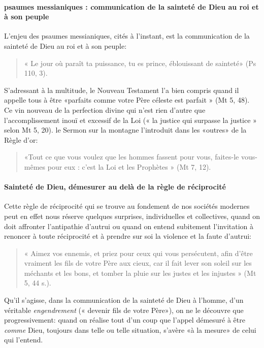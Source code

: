 \paragraph{psaumes messianiques : communication de la sainteté de Dieu au roi et à son peuple}
L'enjeu des psaumes messianiques, cités à l'instant, est la communication de la sainteté de Dieu au roi et à son peuple:
\begin{quote}
    « Le jour où paraît ta puissance, tu es prince, éblouissant de sainteté» (Ps 110, 3). 
\end{quote}
S'adressant à la multitude, le Nouveau Testament l'a bien compris quand il appelle tous à être «parfaits comme votre Père céleste est parfait » (Mt 5, 48).
Ce vin nouveau de la perfection divine qui n'est rien d'autre que l'accomplissement inouï et excessif de la Loi (« la justice qui surpasse la justice » selon Mt 5, 20). le Sermon sur la montagne l'introduit dans les «outres» de la Règle d'or:
\begin{quote}
    «Tout ce que vous voulez que les hommes fassent pour vous, faites-le vous-mêmes pour eux : c'est la Loi et les Prophètes » (Mt 7, 12). 
\end{quote}
\paragraph{Sainteté de Dieu, démesurer au delà de la règle de réciprocité}
Cette règle de réciprocité qui se trouve au fondement de nos sociétés modernes peut en effet nous réserve quelques surprises, individuelles et collectives, quand on doit affronter l'antipathie d'autrui ou quand on entend subitement l'invitation à renoncer à toute réciprocité et à prendre sur soi la violence et la faute d'autrui: \begin{quote}
    « Aimez vos ennemis, et priez pour ceux qui vous persécutent, afin d'être vraiment les fils de votre Père aux cieux, car il fait lever son soleil sur les méchants et les bons, et tomber la pluie sur les justes et les injustes » (Mt 5, 44 s.).
\end{quote}
Qu'il s'agisse, dans la communication de la sainteté de Dieu à l'homme, d'un véritable \textit{engendrement} 
(« devenir fils de votre Père»), on ne le découvre que progressivement: quand on réalise tout d'un coup que l'appel démesuré à être \textit{comme} Dieu, toujours dans telle ou telle situation, s'avère «à la mesure» de celui qui l'entend. 
